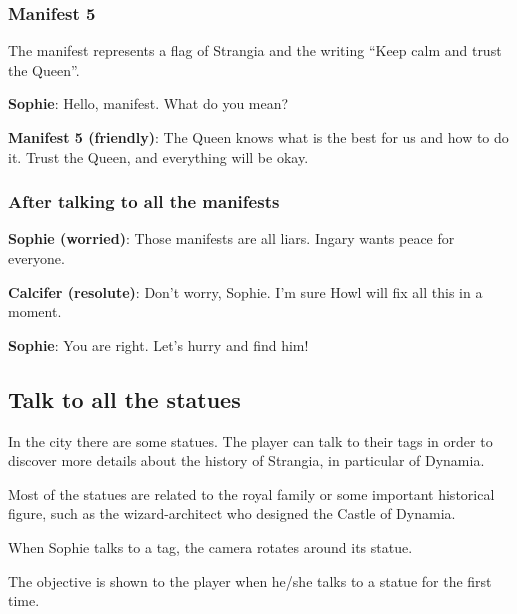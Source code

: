 %
%

\subsubsection*{Manifest 5}
The manifest represents a flag of Strangia and the writing \enquote{Keep calm and trust the Queen}.

\textbf{Sophie}: Hello, manifest. What do you mean?

\textbf{Manifest 5 (friendly)}: The Queen knows what is the best for us and how to do it. Trust the Queen, and everything will be okay.

%
%

\subsubsection*{After talking to all the manifests}
\textbf{Sophie (worried)}: Those manifests are all liars. Ingary wants peace for everyone.

\textbf{Calcifer (resolute)}: Don't worry, Sophie. I'm sure Howl will fix all this in a moment.

\textbf{Sophie}: You are right. Let's hurry and find him!


\subsection{Talk to all the statues}
In the city there are some statues. The player can talk to their tags in order to discover more details about the history of Strangia, in particular of Dynamia.

Most of the statues are related to the royal family or some important historical figure, such as the wizard-architect who designed the Castle of Dynamia.

When Sophie talks to a tag, the camera rotates around its statue.

The objective is shown to the player when he/she talks to a statue for the first time.

